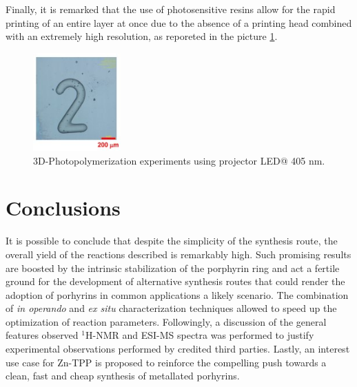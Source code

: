 \documentclass[num-refs]{wiley-article}
\begin{document}
Finally, it is remarked that the use of photosensitive resins allow for the rapid printing of an entire layer at once due to the absence of a printing head combined with an extremely high resolution, as reporeted in the picture \ref{print}.
\begin{figure}
    \centering
    \includegraphics[width=0.3\textwidth]{printed}
    \caption{3D-Photopolymerization experiments using projector LED@ 405 nm.}
    \label{print}
\end{figure}
\section{Conclusions}
It is possible to conclude that despite the simplicity of the synthesis route, the overall yield of the reactions described is remarkably high.
Such promising results are boosted by the intrinsic stabilization of the porphyrin ring and act a fertile ground for the development of alternative synthesis routes that could render the adoption of porhyrins in common applications a likely scenario.
The combination of \textit{in operando} and \textit{ex situ} characterization techniques allowed to speed up the optimization of reaction parameters.
Followingly, a discussion of the general features observed $^{1}$H-NMR and ESI-MS spectra was performed to justify experimental observations performed by credited third parties.
Lastly, an interest use case for Zn-TPP is proposed to reinforce the compelling push towards a clean, fast and cheap synthesis of metallated porhyrins.
\end{document}
